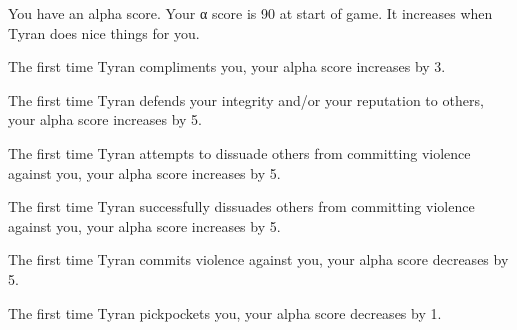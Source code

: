 \documentclass[green]{Sel}
\begin{document}
\name{\gCarminisSoulBond{}}

You have an alpha score. Your α score is 90 at start of game. It increases when Tyran does nice things for you.

The first time Tyran compliments you, your alpha score increases by 3.

The first time Tyran defends your integrity and/or your reputation to others, your alpha score increases by 5.

The first time Tyran attempts to dissuade others from committing violence against you, your alpha score increases by 5.

The first time Tyran successfully dissuades others from committing violence against you, your alpha score increases by 5.

The first time Tyran commits violence against you, your alpha score decreases by 5.

The first time Tyran pickpockets you, your alpha score decreases by 1.
\end{document}
